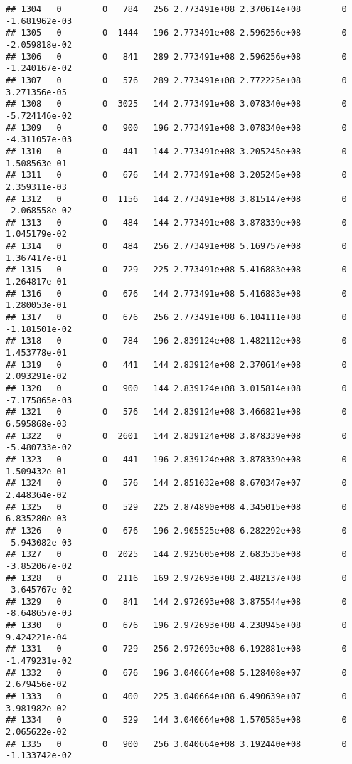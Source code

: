 \documentclass[
]{article}
\begin{document}
\begin{enumerate}
\begin{verbatim}
## 1304   0        0   784   256 2.773491e+08 2.370614e+08        0 -1.681962e-03
## 1305   0        0  1444   196 2.773491e+08 2.596256e+08        0 -2.059818e-02
## 1306   0        0   841   289 2.773491e+08 2.596256e+08        0 -1.240167e-02
## 1307   0        0   576   289 2.773491e+08 2.772225e+08        0  3.271356e-05
## 1308   0        0  3025   144 2.773491e+08 3.078340e+08        0 -5.724146e-02
## 1309   0        0   900   196 2.773491e+08 3.078340e+08        0 -4.311057e-03
## 1310   0        0   441   144 2.773491e+08 3.205245e+08        0  1.508563e-01
## 1311   0        0   676   144 2.773491e+08 3.205245e+08        0  2.359311e-03
## 1312   0        0  1156   144 2.773491e+08 3.815147e+08        0 -2.068558e-02
## 1313   0        0   484   144 2.773491e+08 3.878339e+08        0  1.045179e-02
## 1314   0        0   484   256 2.773491e+08 5.169757e+08        0  1.367417e-01
## 1315   0        0   729   225 2.773491e+08 5.416883e+08        0  1.264817e-01
## 1316   0        0   676   144 2.773491e+08 5.416883e+08        0  1.280053e-01
## 1317   0        0   676   256 2.773491e+08 6.104111e+08        0 -1.181501e-02
## 1318   0        0   784   196 2.839124e+08 1.482112e+08        0  1.453778e-01
## 1319   0        0   441   144 2.839124e+08 2.370614e+08        0  2.093291e-02
## 1320   0        0   900   144 2.839124e+08 3.015814e+08        0 -7.175865e-03
## 1321   0        0   576   144 2.839124e+08 3.466821e+08        0  6.595868e-03
## 1322   0        0  2601   144 2.839124e+08 3.878339e+08        0 -5.480733e-02
## 1323   0        0   441   196 2.839124e+08 3.878339e+08        0  1.509432e-01
## 1324   0        0   576   144 2.851032e+08 8.670347e+07        0  2.448364e-02
## 1325   0        0   529   225 2.874890e+08 4.345015e+08        0  6.835280e-03
## 1326   0        0   676   196 2.905525e+08 6.282292e+08        0 -5.943082e-03
## 1327   0        0  2025   144 2.925605e+08 2.683535e+08        0 -3.852067e-02
## 1328   0        0  2116   169 2.972693e+08 2.482137e+08        0 -3.645767e-02
## 1329   0        0   841   144 2.972693e+08 3.875544e+08        0 -8.648657e-03
## 1330   0        0   676   196 2.972693e+08 4.238945e+08        0  9.424221e-04
## 1331   0        0   729   256 2.972693e+08 6.192881e+08        0 -1.479231e-02
## 1332   0        0   676   196 3.040664e+08 5.128408e+07        0  2.679456e-02
## 1333   0        0   400   225 3.040664e+08 6.490639e+07        0  3.981982e-02
## 1334   0        0   529   144 3.040664e+08 1.570585e+08        0  2.065622e-02
## 1335   0        0   900   256 3.040664e+08 3.192440e+08        0 -1.133742e-02

\end{verbatim}
\end{enumerate}
\end{document}

